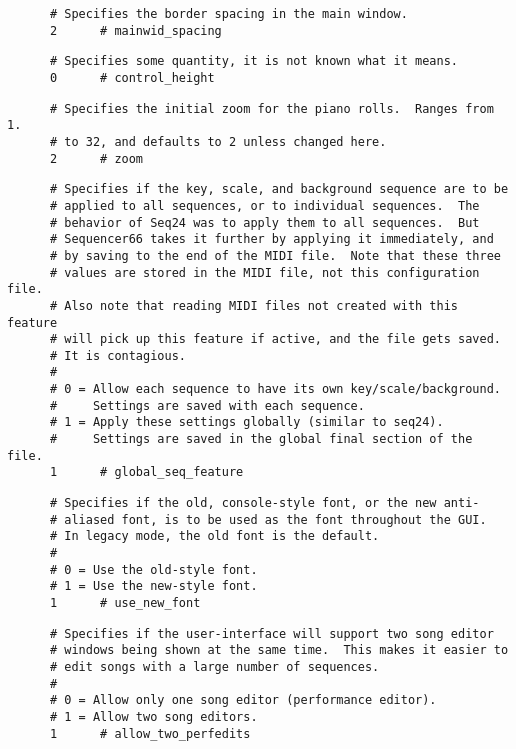    \begin{verbatim}
      # Specifies the border spacing in the main window.
      2      # mainwid_spacing
   \end{verbatim}

   \begin{verbatim}
      # Specifies some quantity, it is not known what it means.
      0      # control_height
   \end{verbatim}

   \begin{verbatim}
      # Specifies the initial zoom for the piano rolls.  Ranges from 1.
      # to 32, and defaults to 2 unless changed here.
      2      # zoom
   \end{verbatim}

   \begin{verbatim}
      # Specifies if the key, scale, and background sequence are to be
      # applied to all sequences, or to individual sequences.  The
      # behavior of Seq24 was to apply them to all sequences.  But
      # Sequencer66 takes it further by applying it immediately, and
      # by saving to the end of the MIDI file.  Note that these three
      # values are stored in the MIDI file, not this configuration file.
      # Also note that reading MIDI files not created with this feature
      # will pick up this feature if active, and the file gets saved.
      # It is contagious.
      #
      # 0 = Allow each sequence to have its own key/scale/background.
      #     Settings are saved with each sequence.
      # 1 = Apply these settings globally (similar to seq24).
      #     Settings are saved in the global final section of the file.
      1      # global_seq_feature
   \end{verbatim}

   \begin{verbatim}
      # Specifies if the old, console-style font, or the new anti-
      # aliased font, is to be used as the font throughout the GUI.
      # In legacy mode, the old font is the default.
      #
      # 0 = Use the old-style font.
      # 1 = Use the new-style font.
      1      # use_new_font
   \end{verbatim}

   \begin{verbatim}
      # Specifies if the user-interface will support two song editor
      # windows being shown at the same time.  This makes it easier to
      # edit songs with a large number of sequences.
      #
      # 0 = Allow only one song editor (performance editor).
      # 1 = Allow two song editors.
      1      # allow_two_perfedits
   \end{verbatim}

